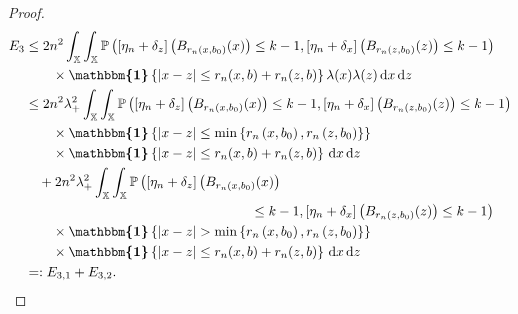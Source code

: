 \documentclass[10pt]{amsart}
\theoremstyle{definition}\newtheorem{defi}[theo]{Definition}\newtheorem{rema}[theo]{Remark}\newtheorem{exam}[theo]{Example}\newtheorem{exem}[theo]{Example}\newtheorem{nota}[theo]{Notation}
\renewcommand*\P{\mathbb{P}}
\newcommand*\X{\mathbb{X}}
\newcommand*\md{\mathrm{d}}
\newcommand{\ind}{\boldsymbol{\mathbbm{1}}}
\newcommand{\set}[1]{\left\{#1\right\}}
\newcommand{\prob}[1]{\P\left(#1\right)}
\begin{document}
\begin{proof}
\begin{align*}
E_3
&\leq {2} n^2 \int_{\X}\int_{\X} \prob{\left[\eta_n + \delta_z\right]\left(B_{r_n(x,b_0)}(x)\right) \leq k-1, \left[\eta_n + \delta_x\right]\left(B_{r_n(z,b_0)}(z)\right) \leq k-1} \\
& \qquad \times \ind\set{|x-z| \leq r_n(x,b) + r_n(z,b)} \lambda(x)\lambda(z) \, \md x \, \md z \\
& \leq {2} n^2 \lambda_+^2 \int_{\X}\int_{\X} \prob{\left[\eta_n + \delta_z\right]\left(B_{r_n(x,b_0)}(x)\right) \leq k-1, \left[\eta_n + \delta_x\right]\left(B_{r_n(z,b_0)}(z)\right) \leq k-1} \\
& \qquad \times \ind\set{|x-z|\leq \min\left\{r_n\left(x,b_0\right),r_n\left(z,b_0\right)\right\}}\\
&\qquad\times\ind\set{|x-z| \leq r_n(x,b) + r_n(z,b)} \, \md x \, \md z \\
& \quad + {2} n^2 \lambda_+^2 \int_{\X}\int_{\X} \prob{\left[\eta_n + \delta_z\right]\left(B_{r_n(x,b_0)}(x)\right)\right.\\
&\mkern300mu\left.\leq k-1, \left[\eta_n + \delta_x\right]\left(B_{r_n(z,b_0)}(z)\right) \leq k-1} \\
& \qquad\times \ind\set{|x-z|> \min
\left\{r_n\left(x,b_0\right),r_n\left(z,b_0\right)\right\}}\\
&\qquad\times \ind\set{|x-z| \leq r_n(x,b) + r_n(z,b)} \, \md x \, \md z \\
& =: E_{3,1}+E_{3,2}.
\end{align*}


\end{proof}
\end{document}
